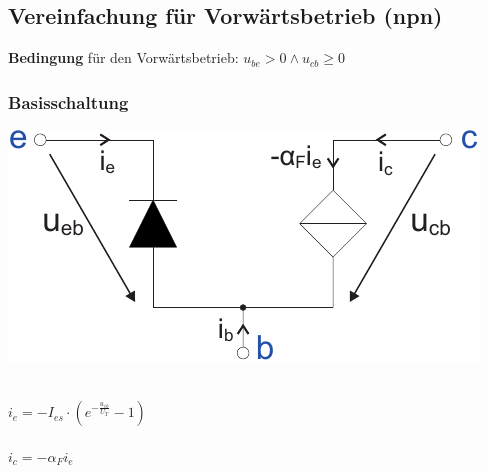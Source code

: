 \documentclass[a4paper,twocolumn,10pt]{article}
\begin{document}
\subsection*{Vereinfachung für Vorwärtsbetrieb (npn)}
\textbf{Bedingung} für den Vorwärtsbetrieb: $u_{be}>0 \wedge u_{cb}\geq 0$
\subsubsection*{Basisschaltung}
\begin{minipage}[b]{0.23\textwidth}
\includegraphics[width=\textwidth]{Grafiken/Basisschaltung_Vereinfachung}\\\\
\end{minipage}
\hfill
\begin{minipage}[b]{0.23\textwidth}
$i_e=-I_{es}\cdot (e^{-\frac{u_{eb}}{U_T}}-1)$\\\\
$i_c=-\alpha_Fi_e$\\\\
\end{minipage}
\end{document}
